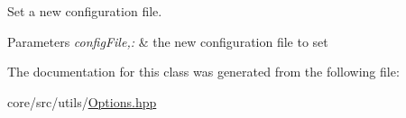 Set a new configuration file. 


\begin{DoxyParams}{Parameters}
{\em configFile,:} & the new configuration file to set \\
\hline
\end{DoxyParams}


The documentation for this class was generated from the following file:\begin{DoxyCompactItemize}
\item 
core/src/utils/\hyperlink{Options_8hpp}{Options.hpp}\end{DoxyCompactItemize}
